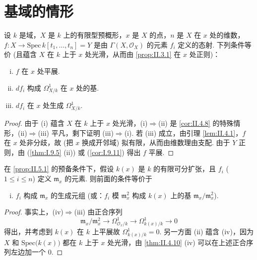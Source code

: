 \section{基域的情形}

\begin{proposition}\label{prop:II.5.1}
设 $k$ 是域，$X$ 是 $k$ 上的有限型预概形，$x$ 是 $X$ 的点，$n$ 是 $X$ 在 $x$ 处的维数，$f \colon X \to \mathrm{Spec}\, k[t_1, \dots, t_n] = Y$ 是由 $\Gamma(X, \mathcal{O}_X)$ 的元素 $f_i$ 定义的态射. 下列条件等价 (且蕴含 $X$ 在 $k$ 上于 $x$ 处光滑，从而由 \ref{prop:II.3.1} 在 $x$ 处正则)：
\begin{enumerate}[(i)]
\item $f$ 在 $x$ 处平展.
\item $df_i$ 构成 $\varOmega_{X/k}^{1}$ 在 $x$ 处的基.
\item $df_i$ 在 $x$ 处生成 $\varOmega_{X/k}^{1}$.
\end{enumerate}
\end{proposition}

\begin{proof}
由于 (i) 蕴含 $X$ 在 $k$ 上于 $x$ 处光滑，(i)$\Rightarrow$(ii) 是 \ref{cor:II.4.8} 的特殊情形，(ii)$\Rightarrow$(iii) 平凡，剩下证明 (iii)$\Rightarrow$(i). 若 (iii) 成立，由引理 \ref{lem:II.4.1}，$f$ 在 $x$ 处非分歧，故 (把 $x$ 换成开邻域) 拟有限，从而由维数理由支配. 由于 $Y$ 正则，由 (\ref{thm:I.9.5} (ii)) 或 (\ref{cor:I.9.11}) 得出 $f$ 平展.
\end{proof}

\begin{corollary}\label{cor:II.5.2}
在 \ref{prop:II.5.1} 的预备条件下，假设 $k(x)$ 是 $k$ 的有限可分扩张，且 $f_i$ ($1 \leqslant i \leqslant n$) 定义 $\mathfrak{m}_x$ 的元素. 则前面的条件等价于
\begin{enumerate}[(i)]
\item[(iv)] $f_i$ 构成 $\mathfrak{m}_x$ 的生成元组 (或：$f_i$ 模 $\mathfrak{m}_x^2$ 构成 $k(x)$ 上的基 $\mathfrak{m}_x/\mathfrak{m}_x^2$).
\end{enumerate}
\end{corollary}

\begin{proof}
事实上，(iv)$\Rightarrow$(iii) 由正合序列
\begin{equation}
\mathfrak{m}_x/\mathfrak{m}_x^2 \longrightarrow \varOmega_{\mathcal{O}_x/k}^{1} \longrightarrow \varOmega_{k(x)/k}^{1} \longrightarrow 0 \tag{5.1}
\label{eq:II.5.1}
\end{equation}
得出，并考虑到 $k(x)$ 在 $k$ 上平展故 $\varOmega_{k(x)/k}^{1} = 0$. 另一方面 (ii) 蕴含 (iv)，因为 $X$ 和 $\mathrm{Spec}\bigl(k(x)\bigr)$ 都在 $k$ 上于 $x$ 处光滑，由 \ref{thm:II.4.10} (iv) 可以在上述正合序列左边加一个 0.
\end{proof}

